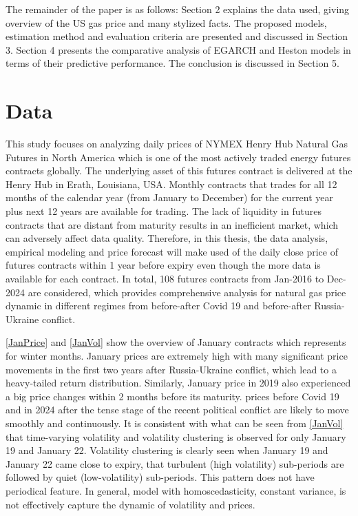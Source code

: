 \documentclass[12pt,a4paper]{article}
\newcommand\colorAutoref[1]{{\hypersetup{linkcolor=black}\autoref{#1}}}
\numberwithin{equation}{section}
\begin{document}
The remainder of the paper is as follows: Section 2 explains the data used, giving overview of the US gas price and many stylized facts. The proposed models, estimation method and evaluation criteria are presented and discussed in Section 3. Section 4 presents the comparative analysis of EGARCH and Heston models in terms of their predictive performance. The conclusion is discussed in Section 5.

\section{Data}

This study focuses on analyzing daily prices of NYMEX Henry Hub Natural Gas Futures in North America which is one of the most actively traded energy futures contracts globally. The underlying asset of this futures contract is delivered at the Henry Hub in Erath, Louisiana, USA. Monthly contracts that trades for all 12 months of the calendar year (from January to December) for the current year plus next 12 years are available for trading. The lack of liquidity in futures contracts that are distant from maturity results in an inefficient market, which can adversely affect data quality. Therefore, in this thesis, the data analysis, empirical modeling and price forecast will make used of the daily close price of futures contracts within 1 year before expiry even though the more data is available for each contract. In total, 108 futures contracts from Jan-2016 to Dec-2024 are considered, which provides comprehensive analysis for natural gas price dynamic in different regimes from before-after Covid 19 and before-after Russia-Ukraine conflict. 

\colorAutoref{JanPrice} and \colorAutoref{JanVol} show the overview of January contracts which represents for winter months. January prices are extremely high with many significant price movements in the first two years after Russia-Ukraine conflict, which lead to a heavy-tailed return distribution. Similarly, January price in 2019 also experienced a big price changes within 2 months before its maturity. prices before Covid 19 and in 2024 after the tense stage of the recent political conflict are likely to move smoothly and continuously. It is consistent with what can be seen from \colorAutoref{JanVol} that time-varying volatility and volatility clustering is observed for only January 19 and January 22. Volatility clustering is clearly seen when January 19 and January 22 came close to expiry, that turbulent (high volatility) sub-periods are followed by quiet (low-volatility) sub-periods. This pattern does not have periodical feature. In general, model with homoscedasticity, constant variance, is not effectively capture the dynamic of volatility and prices.
\end{document}
